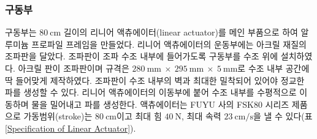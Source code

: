 \subsubsection{구동부}
구동부는 $80\mathrm{~cm}$ 길이의 리니어 액츄에이터(linear actuator)를 메인 부품으로 하여 알루미늄 프로파일 프레임을 만들었다. 리니어 액츄에이터의 운동부에는 아크릴 재질의 조파판을 달았다. 조파판이 조파 수조 내부에 들어가도록 구동부를 수조 위에 설치하였다. 아크릴 판이 조파판이며 규격은 $280\mathrm{~mm} ~\times~ 295\mathrm{~mm} ~\times~5\mathrm{~mm}$로 수조 내부 공간에 딱 들어맞게 제작하였다. 조파판이 수조 내부의 벽과 최대한 밀착되어 있어야 정교한 파를 생성할 수 있다. 리니어 액츄에이터의 이동부에 붙어 수조 내부를 수평적으로 이동하며 물을 밀어내고 파를 생성한다. 액츄에이터는 FUYU 사의 FSK80 시리즈 제품으로 가동범위(stroke)는 $80\mathrm{~cm}$이고 최대 힘 $40\mathrm{~N}$, 최대 속력 $23\mathrm{~cm/s}$을 낼 수 있다(표 \ref{Specification of Linear Actuator}).

  
